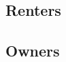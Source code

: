 \documentclass[review,12pt]{elsarticle}
\begin{document}
  \subsection{Renters}
  \subsection{Owners}
















\end{document}
